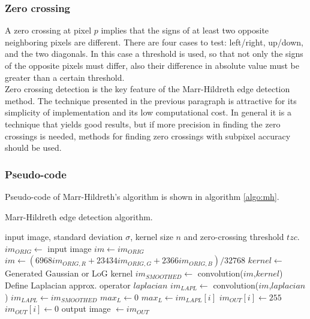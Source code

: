 \documentclass{ipol}
\numberwithin{equation}{section}
\numberwithin{table}{section}
\numberwithin{figure}{section}
\begin{document}

\subsubsection{Zero crossing}

A zero crossing at pixel $p$ implies that the signs of at least two opposite neighboring pixels are 
different. There are four cases to test: left/right, up/down, and the two diagonals. In this case 
a threshold is used, so that not only the signs of the opposite pixels must differ, also their 
difference in absolute value must be greater than a certain threshold.\\

Zero crossing detection is the key feature of the Marr-Hildreth edge detection method. The technique 
presented in the previous paragraph is attractive for its simplicity of implementation and its low 
computational cost. In general it is a technique that yields good results, but if more precision in 
finding the zero crossings is needed, methods for finding zero crossings with subpixel accuracy 
should be used.


\subsubsection{Pseudo-code}

Pseudo-code of Marr-Hildreth's algorithm is shown in algorithm \ref{algo:mh}.

\begin{algorithm}[t]
\caption{Marr-Hildreth edge detection algorithm.}
\label{algo:mh}
\begin{algorithmic}[1]
\REQUIRE input image, standard deviation $\sigma$, kernel size $n$ and zero-crossing threshold $tzc$.
\STATE $im_{ORIG} \leftarrow$ input image
	\STATE $im \leftarrow im_{ORIG}$
\ELSE 
	\STATE $im \leftarrow (6968im_{ORIG,R}+23434im_{ORIG,G}+2366im_{ORIG,B})/32768$ 
\ENDIF
\STATE $kernel \leftarrow$ Generated Gaussian or LoG kernel
\STATE $im_{SMOOTHED} \leftarrow$ convolution($im$,$kernel$)
	\STATE Define Laplacian approx. operator $laplacian$
	\STATE $im_{LAPL} \leftarrow$ convolution($im$,$laplacian$)
\ELSE
	\STATE $im_{LAPL} \leftarrow im_{SMOOTHED}$
\ENDIF
\STATE $max_L \leftarrow 0$
		\STATE $max_L \leftarrow im_{LAPL}[i]$
	\ENDIF
\ENDFOR
{}
		\STATE $im_{OUT}[i] \leftarrow 255$
	\ELSE
		\STATE $im_{OUT}[i] \leftarrow 0$
	\ENDIF
\ENDFOR
\RETURN output image $\leftarrow im_{OUT}$
\end{algorithmic}
\end{algorithm}
\end{document}
